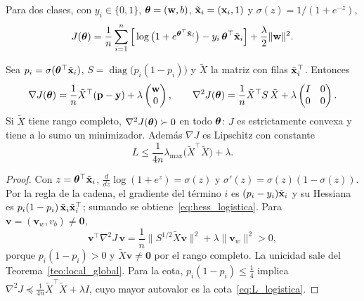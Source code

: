 Para dos clases, con $y_i \in \{0, 1\}$, $\boldsymbol{\theta} = (\mathbf{w}, b)$, $\tilde{\mathbf{x}}_i = (\mathbf{x}_i, 1)$ y $\sigma(z) = 1/(1 + e^{-z})$,
\begin{equation}
  J(\boldsymbol{\theta}) = \frac1n\sum_{i=1}^n\Big[\log\big(1 + e^{\boldsymbol{\theta}^\top\tilde{\mathbf{x}}_i}\big) - y_i\,\boldsymbol{\theta}^\top\tilde{\mathbf{x}}_i\Big] + \frac{\lambda}{2}\lVert\mathbf{w}\rVert^2.
  \label{eq:logistica_binaria}
\end{equation}

\begin{proposicion}
\label{prop:logistica_convexa}
Sea $p_i = \sigma(\boldsymbol{\theta}^\top\tilde{\mathbf{x}}_i)$, $S = \operatorname{diag}\big(p_i(1 - p_i)\big)$ y $\tilde X$ la matriz con filas $\tilde{\mathbf{x}}_i^\top$.
Entonces
\begin{equation}
  \nabla J(\boldsymbol{\theta}) = \frac1n\tilde X^\top(\mathbf{p} - \mathbf{y}) + \lambda\begin{pmatrix}\mathbf{w}\\0\end{pmatrix},
  \qquad
  \nabla^2 J(\boldsymbol{\theta}) = \frac1n\tilde X^\top S\,\tilde X + \lambda\begin{pmatrix}I & 0\\0 & 0\end{pmatrix}.
  \label{eq:hess_logistica}
\end{equation}
Si $\tilde X$ tiene rango completo, $\nabla^2 J(\boldsymbol{\theta}) \succ 0$ en todo $\boldsymbol{\theta}$: $J$ es estrictamente convexa y tiene a lo
sumo un minimizador. Además $\nabla J$ es Lipschitz con constante
\begin{equation}
  L \le \frac{1}{4n}\lambda_{\max}\big(\tilde X^\top\tilde X\big) + \lambda.
  \label{eq:L_logistica}
\end{equation}
\end{proposicion}
\begin{proof}
Con $z = \boldsymbol{\theta}^\top\tilde{\mathbf{x}}_i$, $\frac{d}{dz}\log(1 + e^z) = \sigma(z)$ y $\sigma'(z) = \sigma(z)(1 - \sigma(z))$. Por la regla
de la cadena, el gradiente del término $i$ es $(p_i - y_i)\tilde{\mathbf{x}}_i$ y su Hessiana es $p_i(1 - p_i)\,\tilde{\mathbf{x}}_i\tilde{\mathbf{x}}_i^\top$;
sumando se obtiene~\eqref{eq:hess_logistica}. Para $\mathbf{v} = (\mathbf{v}_w, v_b) \neq \mathbf{0}$,
\[
  \mathbf{v}^\top\nabla^2 J\,\mathbf{v} = \frac1n\big\lVert S^{1/2}\tilde X\mathbf{v}\big\rVert^2 + \lambda\lVert\mathbf{v}_w\rVert^2 > 0,
\]
porque $p_i(1 - p_i) > 0$ y $\tilde X\mathbf{v} \neq \mathbf{0}$ por el rango completo. La unicidad sale del
Teorema~\ref{teo:local_global}. Para la cota, $p_i(1 - p_i) \le \frac14$ implica
$\nabla^2 J \preceq \frac{1}{4n}\tilde X^\top\tilde X + \lambda I$, cuyo mayor autovalor es la cota~\eqref{eq:L_logistica}.
\end{proof}

